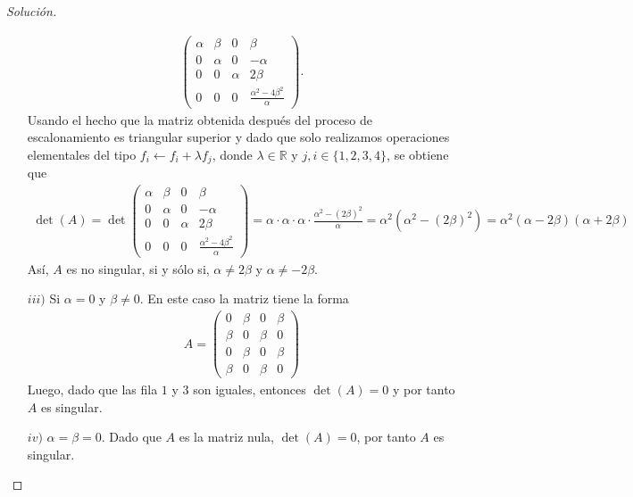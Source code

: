 \documentclass{article}
\begin{document}
\begin{proof}[Solución]
\begin{itemize}
\begin{align*}
\begin{pmatrix}
                    \alpha & \beta  & 0      & \beta                                \\
                    0      & \alpha & 0      & -\alpha                              \\
                    0      & 0      & \alpha & 2\beta                               \\
                    0      & 0      & 0      & \frac{\alpha^{2}-4\beta^{2}}{\alpha}
                \end{pmatrix}.
            \end{align*}
            Usando el hecho que la matriz obtenida después del proceso de escalonamiento es triangular superior y dado que solo realizamos operaciones elementales del tipo $f_{i}\leftarrow f_{i}+ \lambda f_{j}$, donde $\lambda\in\mathbb{R}$ y $j,i\in\{1,2,3,4\}$, se obtiene que
            \begin{align*}
                \det(A) = \det\begin{pmatrix}
                                       \alpha & \beta  & 0      & \beta                                \\
                                       0      & \alpha & 0      & -\alpha                              \\
                                       0      & 0      & \alpha & 2\beta                               \\
                                       0      & 0      & 0      & \frac{\alpha^{2}-4\beta^{2}}{\alpha}
                                   \end{pmatrix} = \alpha\cdot\alpha\cdot\alpha\cdot \frac{\alpha^{2}-(2\beta)^{2}}{\alpha} = \alpha^{2}(\alpha^{2}-(2\beta)^{2}) = \alpha^{2}(\alpha - 2\beta)(\alpha + 2\beta)
            \end{align*}
            Así, $A$ es no singular, si y sólo si, $\alpha \neq 2\beta$ y $\alpha \neq -2\beta$.
        \item[$iii)$] Si $\alpha = 0$ y $\beta\neq 0$. En este caso la matriz tiene la forma
            \begin{align*}
                A = \begin{pmatrix}
                             0     & \beta & 0     & \beta \\
                             \beta & 0     & \beta & 0     \\
                             0     & \beta & 0     & \beta \\
                             \beta & 0     & \beta & 0
                         \end{pmatrix}
            \end{align*}
            Luego, dado que las fila $1$ y $3$ son iguales, entonces $\det(A) = 0$ y por tanto $A$ es singular.
        \item[$iv)$] $\alpha = \beta = 0$. Dado que $A$ es la matriz nula, $\det(A) = 0$, por tanto $A$ es singular.
    \end{itemize}
\end{proof}
\end{document}
